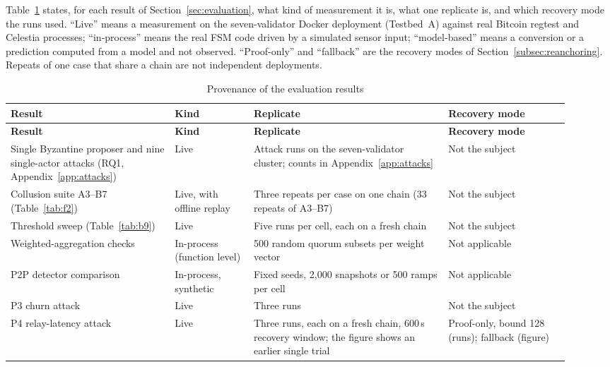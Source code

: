Table~\ref{tab:provenance} states, for each result of Section~\ref{sec:evaluation}, what kind of measurement it is,
what one replicate is, and which recovery mode the runs used. ``Live'' means a measurement on the seven-validator
Docker deployment (Testbed~A) against real Bitcoin regtest and Celestia processes; ``in-process'' means the real FSM code
driven by a simulated sensor input; ``model-based'' means a conversion or a prediction computed from a model and not
observed. ``Proof-only'' and ``fallback'' are the recovery modes of Section~\ref{subsec:reanchoring}. Repeats of one
case that share a chain are not independent deployments.

{\footnotesize
\setlength{\tabcolsep}{3pt}
\renewcommand{\arraystretch}{1.05}
\begin{longtable}{@{}>{\raggedright\arraybackslash}p{0.27\linewidth}>{\raggedright\arraybackslash}p{0.13\linewidth}>{\raggedright\arraybackslash}p{0.32\linewidth}>{\raggedright\arraybackslash}p{0.20\linewidth}@{}}
\caption{Provenance of the evaluation results}\label{tab:provenance}\\
\toprule
\textbf{Result} & \textbf{Kind} & \textbf{Replicate} & \textbf{Recovery mode} \\
\midrule
\endfirsthead
\toprule
\textbf{Result} & \textbf{Kind} & \textbf{Replicate} & \textbf{Recovery mode} \\
\midrule
\endhead
\bottomrule
\endfoot
Single Byzantine proposer and nine single-actor attacks (RQ1, Appendix~\ref{app:attacks}) & Live & Attack runs on the seven-validator cluster; counts in Appendix~\ref{app:attacks} & Not the subject \\
Collusion suite A3--B7 (Table~\ref{tab:f2}) & Live, with offline replay & Three repeats per case on one chain (33 repeats of A3--B7) & Not the subject \\
Threshold sweep (Table~\ref{tab:b9}) & Live & Five runs per cell, each on a fresh chain & Not the subject \\
Weighted-aggregation checks & In-process (function level) & 1{,}500 random quorum subsets per weight vector & Not applicable \\
P2P detector comparison & In-process, synthetic & Fixed seeds, 2{,}000 snapshots or 500 ramps per cell & Not applicable \\
P3 churn attack & Live & Three runs & Not the subject \\
P4 relay-latency attack & Live & Three runs, each on a fresh chain, 600\,s recovery window; the figure shows an earlier single trial & Proof-only, bound 128 (runs); fallback (figure) \\

\end{longtable}}
